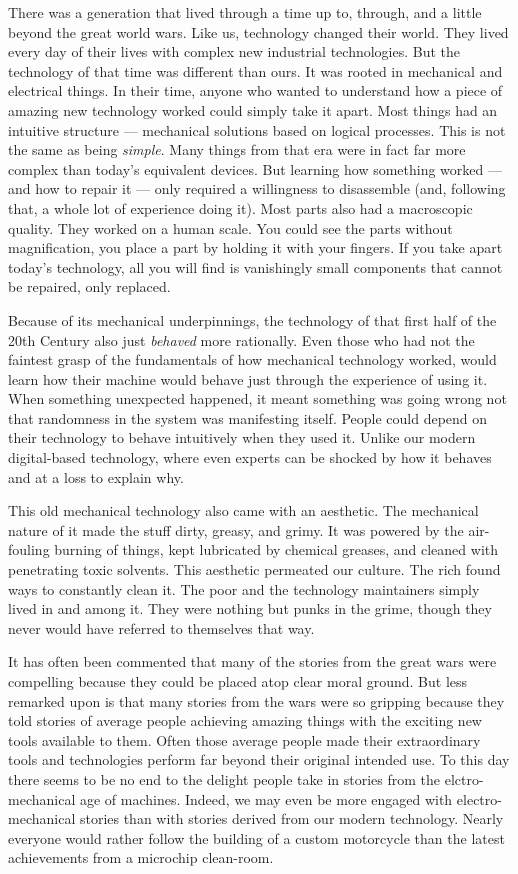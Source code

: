 \documentclass[]{scrbook}
\begin{document}
There was a generation that lived through a time up to, through, and a
little beyond the great world wars. Like us, technology changed their
world. They lived every day of their lives with complex new industrial
technologies. But the technology of that time was different than ours.
It was rooted in mechanical and electrical things. In their time, anyone
who wanted to understand how a piece of amazing new technology worked
could simply take it apart. Most things had an intuitive structure ---
mechanical solutions based on logical processes. This is not the same as
being \emph{simple}. Many things from that era were in fact far more
complex than today's equivalent devices. But learning how something
worked --- and how to repair it --- only required a willingness to
disassemble (and, following that, a whole lot of experience doing it).
Most parts also had a macroscopic quality. They worked on a human scale.
You could see the parts without magnification, you place a part by
holding it with your fingers. If you take apart today's technology, all
you will find is vanishingly small components that cannot be repaired,
only replaced.

Because of its mechanical underpinnings, the technology of that first
half of the 20th Century also just \emph{behaved} more rationally. Even
those who had not the faintest grasp of the fundamentals of how
mechanical technology worked, would learn how their machine would behave
just through the experience of using it. When something unexpected
happened, it meant something was going wrong not that randomness in the
system was manifesting itself. People could depend on their technology
to behave intuitively when they used it. Unlike our modern digital-based
technology, where even experts can be shocked by how it behaves and at a
loss to explain why.

This old mechanical technology also came with an aesthetic. The
mechanical nature of it made the stuff dirty, greasy, and grimy. It was
powered by the air-fouling burning of things, kept lubricated by
chemical greases, and cleaned with penetrating toxic solvents. This
aesthetic permeated our culture. The rich found ways to constantly clean
it. The poor and the technology maintainers simply lived in and among
it. They were nothing but punks in the grime, though they never would
have referred to themselves that way.

It has often been commented that many of the stories from the great wars
were compelling because they could be placed atop clear moral ground.
But less remarked upon is that many stories from the wars were so
gripping because they told stories of average people achieving amazing
things with the exciting new tools available to them. Often those
average people made their extraordinary tools and technologies perform
far beyond their original intended use. To this day there seems to be no
end to the delight people take in stories from the elctro-mechanical age
of machines. Indeed, we may even be more engaged with electro-mechanical
stories than with stories derived from our modern technology. Nearly
everyone would rather follow the building of a custom motorcycle than
the latest achievements from a microchip clean-room.
\end{document}
